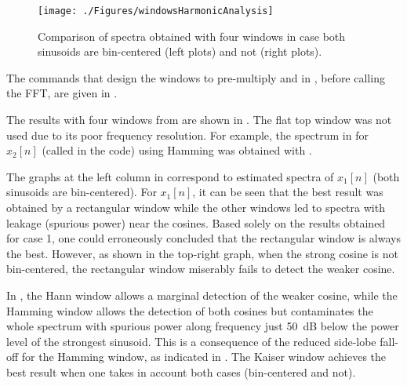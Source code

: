 \begin{figure}[htbp]
\centering
\texttt{[image: ./Figures/windowsHarmonicAnalysis]}
\caption{Comparison of spectra obtained with four windows in case both sinusoids are bin-centered (left plots) and not (right plots).\label{fig:windowsHarmonicAnalysis}}
\end{figure}

The commands that design the windows to pre-multiply  and  in , before calling the FFT, are given in .

The results with four windows from  are shown in . The flat top window was not used due to its poor frequency resolution.
For example, the spectrum in  for $x_2[n]$ (called  in the code) using Hamming was obtained with .

The graphs at the left column in  correspond to estimated spectra of $x_1[n]$ (both sinusoids are bin-centered). For $x_1[n]$, it can be seen that the best result was obtained by a rectangular window while the other windows led to spectra with leakage (spurious power) near the cosines.
Based solely on the results obtained for case 1, one could erroneously concluded that the rectangular window is always the best. However, as shown in the top-right graph, when the strong cosine is not bin-centered, the rectangular window miserably fails to detect the weaker cosine.

In , the Hann window allows a marginal detection of the weaker cosine, while the Hamming window allows the detection of both cosines but contaminates the whole spectrum with spurious power along frequency just 50~dB below the power level of the strongest sinusoid. This is a consequence of the reduced side-lobe fall-off for the Hamming window, as indicated in . The Kaiser window achieves the best result when one takes in account both cases (bin-centered and not).

